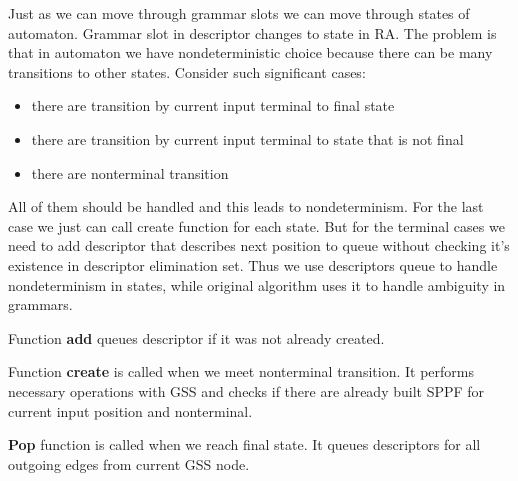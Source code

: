 \documentclass[runningheads,a4paper]{llncs}
\begin{document}
Just as we can move through grammar slots we can move through states 
of automaton. Grammar slot in descriptor changes to state in RA.
The problem is that in automaton we have nondeterministic choice because there can be 
many transitions to other states. Consider such significant cases:
\begin{itemize} 
\item there are transition by current input terminal to final state
\item there are transition by current input terminal to state that is not final
\item there are nonterminal transition
\end{itemize}
All of them should be handled and this leads to nondeterminism. 
For the last case we just can call create function for each state.
But for the terminal cases we need to add descriptor that describes
next position to queue without checking it's existence in descriptor elimination set.
Thus we use descriptors queue to handle nondeterminism in states, while original algorithm uses it to 
handle ambiguity in grammars.



Function \textbf{add} queues descriptor if it was not already created.


Function \textbf{create} is called when we meet nonterminal transition.
It performs necessary operations with GSS and checks if there are already built SPPF for current
input position and nonterminal.

\textbf{Pop} function is called when we reach final state. It queues descriptors for all outgoing edges from current GSS node.
\end{document}
